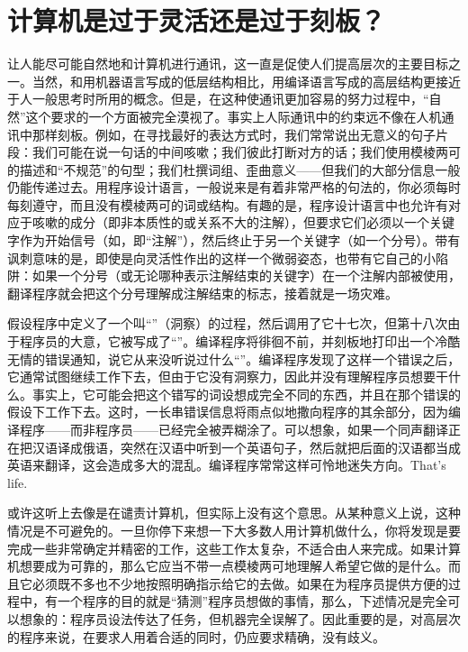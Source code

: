 \section{计算机是过于灵活还是过于刻板？}

让人能尽可能自然地和计算机进行通讯，这一直是促使人们提高层次的主要目标之一。当然，和用机器语言写成的低层结构相比，用编译语言写成的高层结构更接近于人一般思考时所用的概念。但是，在这种使通讯更加容易的努力过程中，“自然”这个要求的一个方面被完全漠视了。事实上人际通讯中的约束远不像在人机通讯中那样刻板。例如，在寻找最好的表达方式时，我们常常说出无意义的句子片段：我们可能在说一句话的中间咳嗽；我们彼此打断对方的话；我们使用模棱两可的描述和“不规范”的句型；我们杜撰词组、歪曲意义——但我们的大部分信息一般仍能传递过去。用程序设计语言，一般说来是有着非常严格的句法的，你必须每时每刻遵守，而且没有模棱两可的词或结构。有趣的是，程序设计语言中也允许有对应于咳嗽的成分（即非本质性的或关系不大的注解），但要求它们必须以一个关键字作为开始信号（如，即“注解”），然后终止于另一个关键字（如一个分号）。带有讽刺意味的是，即使是向灵活性作出的这样一个微弱姿态，也带有它自己的小陷阱：如果一个分号（或无论哪种表示注解结束的关键字）在一个注解内部被使用，翻译程序就会把这个分号理解成注解结束的标志，接着就是一场灾难。

假设程序中定义了一个叫“”（洞察）的过程，然后调用了它十七次，但第十八次由于程序员的大意，它被写成了“”。编译程序将徘徊不前，并刻板地打印出一个冷酷无情的错误通知，说它从来没听说过什么“”。编译程序发现了这样一个错误之后，它通常试图继续工作下去，但由于它没有洞察力，因此并没有理解程序员想要干什么。事实上，它可能会把这个错写的词设想成完全不同的东西，并且在那个错误的假设下工作下去。这时，一长串错误信息将雨点似地撒向程序的其余部分，因为编译程序——而非程序员——已经完全被弄糊涂了。可以想象，如果一个同声翻译正在把汉语译成俄语，突然在汉语中听到一个英语句子，然后就把后面的汉语都当成英语来翻译，这会造成多大的混乱。编译程序常常这样可怜地迷失方向。That's life.

或许这听上去像是在谴责计算机，但实际上没有这个意思。从某种意义上说，这种情况是不可避免的。一旦你停下来想一下大多数人用计算机做什么，你将发现是要完成一些非常确定并精密的工作，这些工作太复杂，不适合由人来完成。如果计算机想要成为可靠的，那么它应当不带一点模棱两可地理解人希望它做的是什么。而且它必须既不多也不少地按照明确指示给它的去做。如果在为程序员提供方便的过程中，有一个程序的目的就是“猜测”程序员想做的事情，那么，下述情况是完全可以想象的：程序员设法传达了任务，但机器完全误解了。因此重要的是，对高层次的程序来说，在要求人用着合适的同时，仍应要求精确，没有歧义。


